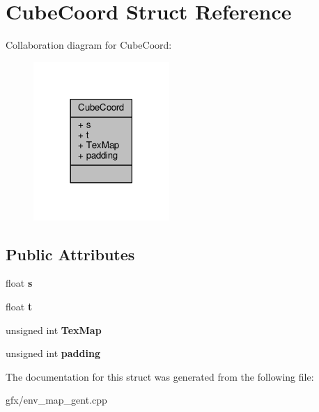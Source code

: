 \hypertarget{structCubeCoord}{}\section{Cube\+Coord Struct Reference}
\label{structCubeCoord}


Collaboration diagram for Cube\+Coord\+:
\nopagebreak
\begin{figure}[H]
\begin{center}
\leavevmode
\includegraphics[width=146pt]{dd/d59/structCubeCoord__coll__graph}
\end{center}
\end{figure}
\subsection*{Public Attributes}
\begin{DoxyCompactItemize}
\item 
float {\bfseries s}\hypertarget{structCubeCoord_ab3ec852708c7976e65c20f07c242b119}{}\label{structCubeCoord_ab3ec852708c7976e65c20f07c242b119}

\item 
float {\bfseries t}\hypertarget{structCubeCoord_aa22097ae5d187ed54514eb7f5981e3bc}{}\label{structCubeCoord_aa22097ae5d187ed54514eb7f5981e3bc}

\item 
unsigned int {\bfseries Tex\+Map}\hypertarget{structCubeCoord_afede03b38c070b3d845cd8ce2e7e97f7}{}\label{structCubeCoord_afede03b38c070b3d845cd8ce2e7e97f7}

\item 
unsigned int {\bfseries padding}\hypertarget{structCubeCoord_a8758175c69fa3dbc0edb2855e4cb9eb7}{}\label{structCubeCoord_a8758175c69fa3dbc0edb2855e4cb9eb7}

\end{DoxyCompactItemize}


The documentation for this struct was generated from the following file\+:\begin{DoxyCompactItemize}
\item 
gfx/env\+\_\+map\+\_\+gent.\+cpp\end{DoxyCompactItemize}
